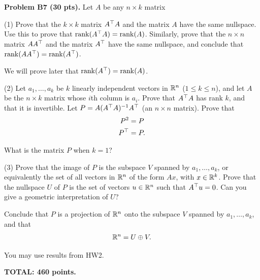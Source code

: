 \documentclass[12pt]{article}
\begin{document}
\vspace {0.25cm}\noindent
{\bf Problem B7 (30 pts).} 
Let $A$ be any $n\times k$ matrix

\medskip
(1)
Prove that the $k\times k$ matrix  $A^{\top} A$ and the matrix $A$
have the same nullspace. Use this  to  prove that 
$\mathrm{rank}(A^{\top} A) = \mathrm{rank}(A)$.
Similarly, prove that the $n\times n$ matrix  $AA^{\top}$ and the
matrix $A^{\top}$
have the same nullspace, and conclude that
$\mathrm{rank}(AA^{\top}) = \mathrm{rank}(A^{\top})$.

\medskip
We will prove later that
$\mathrm{rank}(A^{\top}) =  \mathrm{rank}(A)$.

\medskip
(2)
Let $a_1, \ldots, a_k$ be $k$ linearly independent vectors in $\mathbb{R}^n$
($1 \leq k \leq n$), and let $A$ be the $n\times k$ matrix whose $i$th
column is $a_i$.
Prove that $A^{\top}A$ has rank $k$, and that it is
invertible. Let $P = A(A^{\top}A)^{-1} A^{\top}$ (an $n\times n$ matrix).
Prove that
\begin{align*}
P^2 & = P \\
P^{\top} & = P.
\end{align*} 

What is the matrix $P$ when $k = 1$?

\medskip
(3)
Prove that the image of $P$ is the subspace $V$ spanned by
$a_1, \ldots, a_k$, or equivalently the set of all vectors in $\mathbb{R}^n$
of the form $A x$, with $x\in \mathbb{R}^k$.
Prove that the nullspace $U$ of $P$ is the set  of vectors $u\in
\mathbb{R}^n$  such that
$A^{\top} u = 0$.
Can you give a geometric interpretation of $U$?

\medskip
Conclude that $P$ is a projection of $\mathbb{R}^n$ onto the
subspace $V$ spanned by $a_1, \ldots, a_k$, and that
\[
\mathbb{R}^n = U \oplus V.
\]

\hint 
You may use results  from HW2.

\vspace{0.5cm}\noindent
{\bf TOTAL:  460 points.}
\end{document}
